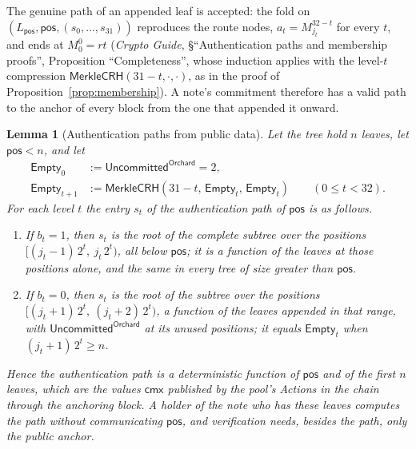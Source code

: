 \documentclass[11pt,a4paper]{article}
\newtheorem{lemma}[theorem]{Lemma}
\theoremstyle{definition}
\newcommand{\cmx}{\mathsf{cmx}}
\begin{document}
The genuine path of an appended leaf is accepted: the fold on
$(L_{\mathsf{pos}}, \mathsf{pos}, (s_0, \dots, s_{31}))$ reproduces the route
nodes, $a_t = M^{32-t}_{j_t}$ for every $t$, and ends at
$M^0_0 = \mathit{rt}$ (\emph{Crypto Guide}, \S``Authentication paths and
membership proofs'', Proposition ``Completeness'', whose induction applies
with the level-$t$ compression
$\mathsf{MerkleCRH}(31 - t, \cdot, \cdot)$, as in the proof of
Proposition~\ref{prop:membership}). A note's commitment therefore has a
valid path to the anchor of every block from the one that appended it
onward.

\begin{lemma}[Authentication paths from public data]\label{lem:paths}
Let the tree hold $n$ leaves, let $\mathsf{pos} < n$, and let
\begin{align*}
  \mathsf{Empty}_0 &:= \mathsf{Uncommitted}^{\mathsf{Orchard}} = 2, \\
  \mathsf{Empty}_{t+1} &:= \mathsf{MerkleCRH}(31 - t,\, \mathsf{Empty}_t,\,
    \mathsf{Empty}_t) \qquad (0 \le t < 32).
\end{align*}
For each level $t$ the entry $s_t$ of the authentication path of
$\mathsf{pos}$ is as follows.
\begin{enumerate}
\item[(i)] If $b_t = 1$, then $s_t$ is the root of the complete subtree over
  the positions $[(j_t - 1)\, 2^t,\ j_t\, 2^t)$, all below $\mathsf{pos}$; it
  is a function of the leaves at those positions alone, and the same in
  every tree of size greater than $\mathsf{pos}$.
\item[(ii)] If $b_t = 0$, then $s_t$ is the root of the subtree over the
  positions $[(j_t + 1)\, 2^t,\ (j_t + 2)\, 2^t)$, a function of the leaves
  appended in that range, with $\mathsf{Uncommitted}^{\mathsf{Orchard}}$ at
  its unused positions; it equals $\mathsf{Empty}_t$ when
  $(j_t + 1)\, 2^t \ge n$.
\end{enumerate}
Hence the authentication path is a deterministic function of $\mathsf{pos}$
and of the first $n$ leaves, which are the values $\cmx$ published by the
pool's Actions in the chain through the anchoring block. A holder of the
note who has these leaves computes the path without communicating
$\mathsf{pos}$, and verification needs, besides the path, only the public
anchor.
\end{lemma}
\end{document}
